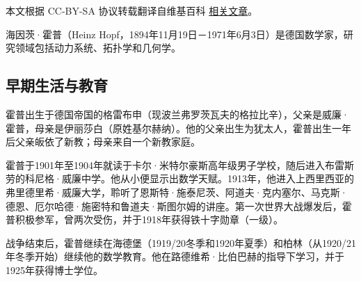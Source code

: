 
本文根据 CC-BY-SA 协议转载翻译自维基百科 \href{https://en.wikipedia.org/wiki/Heinz_Hopf}{相关文章}。

海因茨·霍普（Heinz Hopf，1894年11月19日－1971年6月3日）是德国数学家，研究领域包括动力系统、拓扑学和几何学。
\subsection{早期生活与教育}
霍普出生于德国帝国的格雷布申（现波兰弗罗茨瓦夫的格拉比辛），父亲是威廉·霍普，母亲是伊丽莎白（原姓基尔赫纳）。他的父亲出生为犹太人，霍普出生一年后父亲皈依了新教；母亲来自一个新教家庭。

霍普于1901年至1904年就读于卡尔·米特尔豪斯高年级男子学校，随后进入布雷斯劳的科尼格·威廉中学。他从小便显示出数学天赋。1913年，他进入上西里西亚的弗里德里希·威廉大学，聆听了恩斯特·施泰尼茨、阿道夫·克内塞尔、马克斯·德恩、厄尔哈德·施密特和鲁道夫·斯图尔姆的讲座。第一次世界大战爆发后，霍普积极参军，曾两次受伤，并于1918年获得铁十字勋章（一级）。

战争结束后，霍普继续在海德堡（1919/20冬季和1920年夏季）和柏林（从1920/21年冬季开始）继续他的数学教育。他在路德维希·比伯巴赫的指导下学习，并于1925年获得博士学位。
